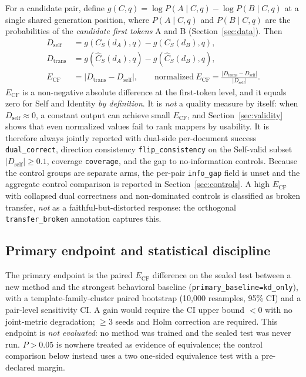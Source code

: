 \documentclass[11pt,a4paper]{article}
\begin{document}
For a candidate pair, define $g(C,q)=\log P(A\mid C,q)-\log P(B\mid C,q)$ at a
single shared generation position, where $P(A\mid C,q)$ and $P(B\mid C,q)$ are
the probabilities of the \emph{candidate first tokens} A and B
(Section~\ref{sec:data}). Then
\begin{align}
D_{\mathrm{self}} &= g(C_S(d_A),q)-g(C_S(d_B),q),\\
D_{\mathrm{trans}} &= g(\hat C_S(d_A),q)-g(\hat C_S(d_B),q),\\
E_{\mathrm{CF}} &= |D_{\mathrm{trans}}-D_{\mathrm{self}}|,\qquad
\mathrm{normalized}\ E_{\mathrm{CF}}=\frac{|D_{\mathrm{trans}}-D_{\mathrm{self}}|}
{|D_{\mathrm{self}}|}.
\end{align}
$E_{\mathrm{CF}}$ is a non-negative absolute difference at the first-token
level, and it equals zero for Self and Identity \emph{by definition}. It is
\emph{not} a quality measure by itself: when $D_{\mathrm{self}}\approx0$, a
constant output can achieve small $E_{\mathrm{CF}}$, and Section~\ref{sec:validity}
shows that even normalized values fail to rank mappers by usability. It is
therefore always jointly reported with dual-side per-document success
\texttt{dual\_correct}, direction consistency \texttt{flip\_consistency} on the
Self-valid subset $|D_{\mathrm{self}}|\ge0.1$, coverage \texttt{coverage}, and
the gap to no-information controls. Because the control groups are separate
arms, the per-pair \texttt{info\_gap} field is unset and the aggregate control
comparison is reported in Section~\ref{sec:controls}. A high $E_{\mathrm{CF}}$
with collapsed dual correctness and non-dominated controls is classified as
broken transfer, \emph{not} as a faithful-but-distorted response: the
orthogonal \texttt{transfer\_broken} annotation captures this.

\subsection{Primary endpoint and statistical discipline}
\label{sec:stats}

The primary endpoint is the paired $E_{\mathrm{CF}}$ difference on the sealed
test between a new method and the strongest behavioral baseline
(\texttt{primary\_baseline=kd\_only}), with a template-family-cluster paired
bootstrap (10{,}000 resamples, 95\% CI) and a pair-level sensitivity CI. A gain
would require the CI upper bound $<0$ with no joint-metric degradation;
$\geq3$ seeds and Holm correction are required. This endpoint is
\emph{not evaluated}: no method was trained and the sealed test was never run.
$P>0.05$ is nowhere treated as evidence of equivalence; the control comparison
below instead uses a two one-sided equivalence test with a pre-declared margin.
\end{document}
